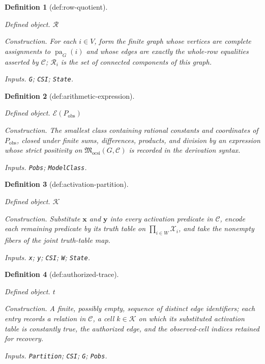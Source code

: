 \documentclass{article}
\newtheorem{definition}{Definition}
\begin{document}
\begin{definition}[def:row-quotient]\label{def:row-quotient}
\par\smallskip\noindent\emph{Defined object.} \(\mathcal R\)
\par\smallskip\noindent\emph{Construction.} For each \(i\in V\), form the finite graph whose vertices are complete assignments to \(\operatorname{pa}_G(i)\) and whose edges are exactly the whole-row equalities asserted by \(\mathcal C\); \(\mathcal R_i\) is the set of connected components of this graph.
\par\smallskip\noindent\emph{Inputs.} \texttt{G}; \texttt{CSI}; \texttt{State}.
\end{definition}

\begin{definition}[def:arithmetic-expression]\label{def:arithmetic-expression}
\par\smallskip\noindent\emph{Defined object.} \(\mathscr E(P_{\mathrm{obs}})\)
\par\smallskip\noindent\emph{Construction.} The smallest class containing rational constants and coordinates of \(P_{\mathrm{obs}}\), closed under finite sums, differences, products, and division by an expression whose strict positivity on \(\mathfrak M_{\mathrm{ocsi}}(G,\mathcal C)\) is recorded in the derivation syntax.
\par\smallskip\noindent\emph{Inputs.} \texttt{Pobs}; \texttt{ModelClass}.
\end{definition}

\begin{definition}[def:activation-partition]\label{def:activation-partition}
\par\smallskip\noindent\emph{Defined object.} \(\mathcal K\)
\par\smallskip\noindent\emph{Construction.} Substitute \(\mathbf x\) and \(\mathbf y\) into every activation predicate in \(\mathcal C\), encode each remaining predicate by its truth table on \(\prod_{i\in W}\mathcal X_i\), and take the nonempty fibers of the joint truth-table map.
\par\smallskip\noindent\emph{Inputs.} \texttt{x}; \texttt{y}; \texttt{CSI}; \texttt{W}; \texttt{State}.
\end{definition}

\begin{definition}[def:authorized-trace]\label{def:authorized-trace}
\par\smallskip\noindent\emph{Defined object.} \(t\)
\par\smallskip\noindent\emph{Construction.} A finite, possibly empty, sequence of distinct edge identifiers; each entry records a relation in \(\mathcal C\), a cell \(k\in\mathcal K\) on which its substituted activation table is constantly true, the authorized edge, and the observed-cell indices retained for recovery.
\par\smallskip\noindent\emph{Inputs.} \texttt{Partition}; \texttt{CSI}; \texttt{G}; \texttt{Pobs}.
\end{definition}
\end{document}
